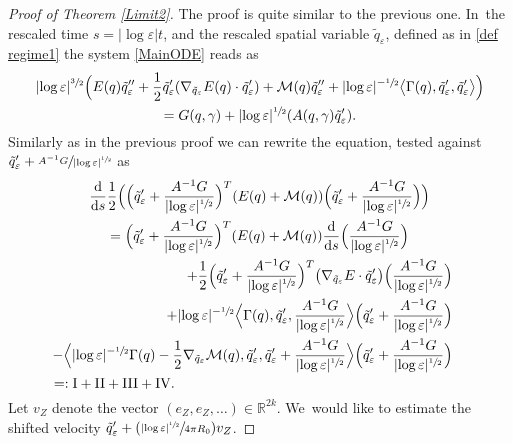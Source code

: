 \documentclass[10pt]{amsart}
\let\epsilon\varepsilon
\newcommand{\Psfrac}[2]{(\sfrac{#1}{#2})}
\newcommand{\rI}{\mathrm{I}}
\newcommand{\rII}{\mathrm{II}}
\newcommand{\rIII}{\mathrm{III}}
\newcommand{\rIV}{\mathrm{IV}}
\theoremstyle{definition}
\newcommand\R{\mathbb{R}}
\newcommand\eq{=}
\let\eps\epsilon
\let\mel\relax
\begin{document}
\begin{proof}[Proof of Theorem \ref{Limit2}]
The proof is quite similar to the previous one. In~the rescaled time $s=|{\log\eps}|t$, and the rescaled spatial variable $\tilde{q}_\eps$, defined as in \eqref{def regime1} the system \eqref{MainODE} reads as
\begin{multline}\label{rescaled ODE 2}
|{\log\eps}|^{\sfrac{3}{2}}\Bigl(E(q)\tilde{q}_{\eps}''+\frac{1}{2}\tilde{q}_{\eps}'(\nabla_{\tilde{q}_\eps}E(q)\cdot\tilde{q}_{\eps}')+\mathcal{M}(q)\tilde{q}_\eps''+|{\log\eps}|^{-\sfrac{1}{2}}\bigl\langle\Gamma(q),\tilde{q}_{\eps}',\tilde{q}_{\eps}'\bigr\rangle \Bigr)\\
\eq G(q,\gamma)+|{\log\eps}|^{\sfrac{1}{2}}(A(q,\gamma)\tilde{q}_{\eps}').
\end{multline}
Similarly as in the previous proof we can rewrite the equation, tested against $\tilde{q}_\eps'+\sfrac{A^{-1}G}{|{\log\eps}|^{\sfrac{1}{2}}}$ as
\begin{multline*}
\mel\frac{\text{d}}{\text{d}s}\frac{1}{2}\Bigl(\Bigl(\tilde{q}_\eps'+\frac{A^{-1}G}{|{\log\eps}|^{\sfrac{1}{2}}}\Bigr)^T(E(q)+\mathcal{M}(q))\Bigl(\tilde{q}_\eps'+\frac{A^{-1}G}{|{\log\eps}|^{\sfrac{1}{2}}}\Bigr)\Bigr)\\
=\Bigl(\tilde{q}_\eps'+\frac{A^{-1}G}{|{\log\eps}|^{\sfrac{1}{2}}}\Bigr)^T(E(q)+\mathcal{M}(q))\frac{\text{d}}{\text{d}s}\Bigl(\frac{A^{-1}G}{|{\log\eps}|^{\sfrac{1}{2}}}\Bigr)\\
\shoveright{+\frac{1}{2}\Bigl(\tilde{q}_\eps'+\frac{A^{-1}G}{|{\log\eps}|^{\sfrac{1}{2}}}\Bigr)^T\bigl(\nabla_{\tilde{q}_\eps}E\cdot\tilde{q}_\eps'\bigr)\Bigl(\frac{A^{-1}G}{|{\log\eps}|^{\sfrac{1}{2}}}\Bigr)}\\
\shoveright{+|{\log\eps}|^{-\sfrac{1}{2}}\Bigl\langle \Gamma(q),\tilde{q}_\eps',\frac{A^{-1}G}{|{\log\eps}|^{\sfrac{1}{2}}}\Bigr\rangle\Bigl(\tilde{q}_\eps'+\frac{A^{-1}G}{|{\log\eps}|^{\sfrac{1}{2}}}\Bigr)}\\
\shoveright{-\Bigl\langle |{\log\eps}|^{-\sfrac{1}{2}}\Gamma(q)-\frac{1}{2}\nabla_{\tilde{q}_\eps}\mathcal{M}(q),\tilde{q}_\eps',\tilde{q}_\eps'+\frac{A^{-1}G}{|{\log\eps}|^{\sfrac{1}{2}}}\Bigr\rangle\Bigl(\tilde{q}_\eps'+\frac{A^{-1}G}{|{\log\eps}|^{\sfrac{1}{2}}}\Bigr)}\\
=:\rI+\rII+\rIII+\rIV.\hspace*{7.3cm}
\end{multline*}
Let $v_Z$ denote the vector $(e_Z,e_Z,\dots)\in \R^{2k}$. We~would like to estimate the shifted velocity $\tilde{q}_\eps'+\Psfrac{|{\log\eps}|^{\sfrac{1}{2}}}{4\pi R_0}v_Z$.

\end{proof}
\end{document}
